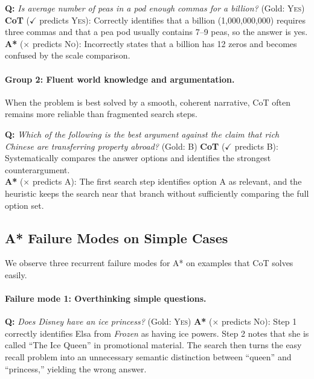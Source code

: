 \documentclass[10pt]{article}
\begin{document}
\begin{examplebox}[title=StrategyQA --- Direct Factual Reasoning]
\textbf{Q:} \emph{Is average number of peas in a pod enough commas for a billion?} \quad (Gold: \textsc{Yes})
\tcblower
\textbf{CoT} ($\checkmark$ predicts \textsc{Yes}): Correctly identifies that a billion (1,000,000,000) requires three commas and that a pea pod usually contains 7--9 peas, so the answer is yes.\\[4pt]
\textbf{A*} ($\times$ predicts \textsc{No}): Incorrectly states that a billion has 12 zeros and becomes confused by the scale comparison.
\end{examplebox}

\paragraph{Group 2: Fluent world knowledge and argumentation.}
When the problem is best solved by a smooth, coherent narrative, CoT often remains more reliable than fragmented search steps.

\begin{examplebox}[title=LogicQA --- Fluent Argumentation]
\textbf{Q:} \emph{Which of the following is the best argument against the claim that rich Chinese are transferring property abroad?} \quad (Gold: B)
\tcblower
\textbf{CoT} ($\checkmark$ predicts B): Systematically compares the answer options and identifies the strongest counterargument.\\[4pt]
\textbf{A*} ($\times$ predicts A): The first search step identifies option A as relevant, and the heuristic keeps the search near that branch without sufficiently comparing the full option set.
\end{examplebox}

\subsection{A* Failure Modes on Simple Cases}
\label{app:astar_failures}

We observe three recurrent failure modes for A* on examples that CoT solves easily.

\paragraph{Failure mode 1: Overthinking simple questions.}

\begin{examplebox}[title=StrategyQA --- Overthinking]
\textbf{Q:} \emph{Does Disney have an ice princess?} \quad (Gold: \textsc{Yes})
\tcblower
\textbf{A*} ($\times$ predicts \textsc{No}): Step 1 correctly identifies Elsa from \emph{Frozen} as having ice powers. Step 2 notes that she is called ``The Ice Queen'' in promotional material. The search then turns the easy recall problem into an unnecessary semantic distinction between ``queen'' and ``princess,'' yielding the wrong answer.
\end{examplebox}
\end{document}
